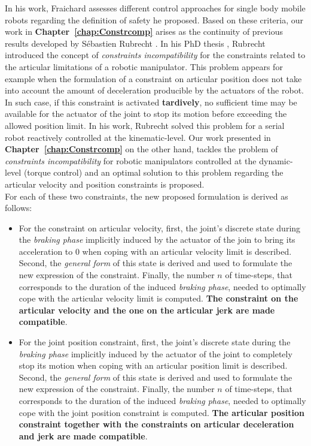 In his work, Fraichard assesses different control approaches for single body mobile robots regarding the definition of safety he proposed. Based on these criteria, our work in \textbf{Chapter~\ref{chap:Constrcomp}} arises as the continuity of previous results developed by S{\'e}bastien Rubrecht \cite{rubrecht2010constraints}. In his PhD thesis \cite{rubrecht:tel-00654514}, Rubrecht introduced the concept of \textit{constraints incompatibility} for  the constraints related to the articular limitations of a robotic manipulator. This problem appears for example when the formulation of a constraint on articular position does not take into account the amount of deceleration producible by the actuators of the robot. In such case, if this constraint is activated \textbf{tardively}, no sufficient time may be available for the actuator of the joint to stop its motion before exceeding the allowed position limit. In his work, Rubrecht solved this problem for a serial robot reactively controlled at the kinematic-level. Our work presented in \textbf{Chapter~\ref{chap:Constrcomp}} on the other hand, tackles the problem of \textit{constraints incompatibility} for robotic manipulators controlled at the dynamic-level (torque control) and an optimal solution to this problem regarding the articular velocity and position constraints is proposed.\\
For each of these two constraints, the new proposed formulation is derived as follows:
\begin{itemize}
\item For the constraint on articular velocity, first, the joint's discrete state during the \textit{braking phase} implicitly induced by the actuator of the join to bring its acceleration to $0$ when coping with an articular velocity limit is described. Second, the \textit{general form} of this state is derived and used to formulate the new expression of the constraint. Finally, the number $n$ of time-steps, that corresponds to the duration of the induced \textit{braking phase}, needed to optimally cope with the articular velocity limit is computed. \textbf{The constraint on the articular velocity and the one on the articular jerk are made compatible}.
\item For the joint position constraint, first, the joint's discrete state during the \textit{braking phase} implicitly induced by the actuator of the joint to completely stop its motion when coping with an articular position limit is described. Second, the \textit{general form} of this state is derived and used to formulate the new expression of the constraint. Finally, the number $n$ of time-steps, that corresponds to the duration of the induced \textit{braking phase}, needed to optimally cope with the joint position constraint is computed. \textbf{The articular position constraint together with the constraints on articular deceleration and jerk are made compatible}.
\end{itemize}

